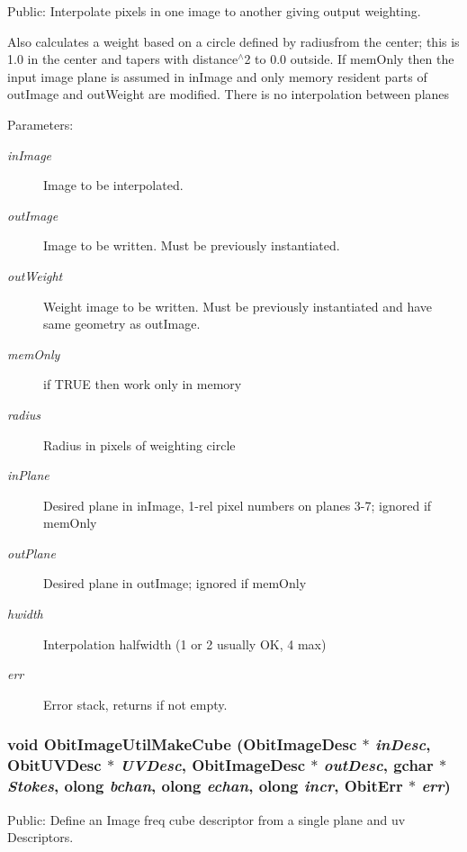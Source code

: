 Public: Interpolate pixels in one image to another giving output weighting. 

Also calculates a weight based on a circle defined by radiusfrom the center; this is 1.0 in the center and tapers with distance$^\wedge$2 to 0.0 outside. If mem\-Only then the input image plane is assumed in in\-Image and only memory resident parts of out\-Image and out\-Weight are modified. There is no interpolation between planes \begin{Desc}
\item[Parameters:]
\begin{description}
\item[{\em in\-Image}]Image to be interpolated. \item[{\em out\-Image}]Image to be written. Must be previously instantiated. \item[{\em out\-Weight}]Weight image to be written. Must be previously instantiated and have same geometry as out\-Image. \item[{\em mem\-Only}]if TRUE then work only in memory \item[{\em radius}]Radius in pixels of weighting circle \item[{\em in\-Plane}]Desired plane in in\-Image, 1-rel pixel numbers on planes 3-7; ignored if mem\-Only \item[{\em out\-Plane}]Desired plane in out\-Image; ignored if mem\-Only \item[{\em hwidth}]Interpolation halfwidth (1 or 2 usually OK, 4 max) \item[{\em err}]Error stack, returns if not empty. \end{description}
\end{Desc}
\subsubsection{\setlength{\rightskip}{0pt plus 5cm}void Obit\-Image\-Util\-Make\-Cube ({\bf Obit\-Image\-Desc} $\ast$ {\em in\-Desc}, {\bf Obit\-UVDesc} $\ast$ {\em UVDesc}, {\bf Obit\-Image\-Desc} $\ast$ {\em out\-Desc}, gchar $\ast$ {\em Stokes}, {\bf olong} {\em bchan}, {\bf olong} {\em echan}, {\bf olong} {\em incr}, {\bf Obit\-Err} $\ast$ {\em err})}\label{ObitImageUtil_8h_a15}


Public: Define an Image freq cube descriptor from a single plane and uv Descriptors. 

